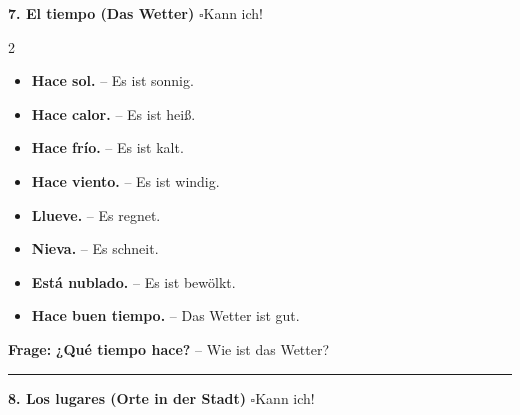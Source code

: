 \documentclass[10pt, a4paper]{article}
\newcommand{\es}[1]{\textcolor{spanisch}{\textbf{#1}}}
\newcommand{\checkbox}{$\square$\hspace{5pt}}
\begin{document}
\vspace{6pt}


\begin{themabox}

\textbf{\textcolor{spanisch}{7. El tiempo (Das Wetter)}} \hfill \checkbox Kann ich!

\small
\begin{multicols}{2}
\begin{itemize}[leftmargin=15pt, itemsep=1pt]
    \item \es{Hace sol.} -- Es ist sonnig.
    \item \es{Hace calor.} -- Es ist heiß.
    \item \es{Hace frío.} -- Es ist kalt.
    \item \es{Hace viento.} -- Es ist windig.
\end{itemize}
\columnbreak
\begin{itemize}[leftmargin=15pt, itemsep=1pt]
    \item \es{Llueve.} -- Es regnet.
    \item \es{Nieva.} -- Es schneit.
    \item \es{Está nublado.} -- Es ist bewölkt.
    \item \es{Hace buen tiempo.} -- Das Wetter ist gut.
\end{itemize}
\end{multicols}

\textbf{Frage:} \es{¿Qué tiempo hace?} -- Wie ist das Wetter?

\vspace{3pt}
\hrule
\vspace{3pt}

\textbf{\textcolor{spanisch}{8. Los lugares (Orte in der Stadt)}} \hfill \checkbox Kann ich!


\end{themabox}
\end{document}
